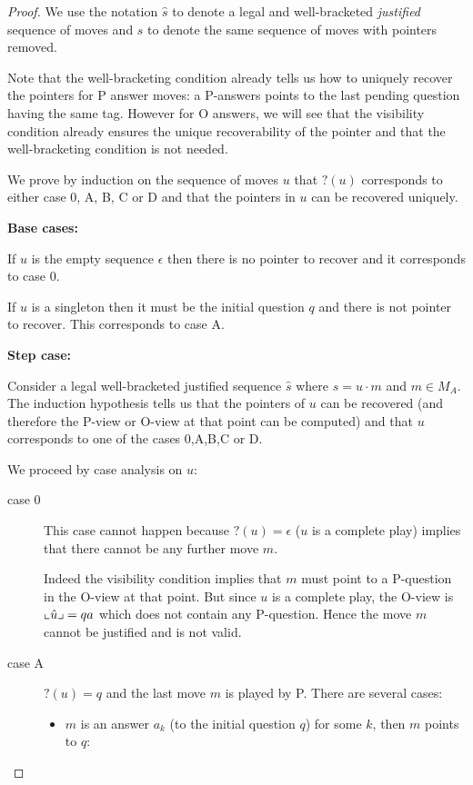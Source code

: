 \begin{proof}
We use the notation $\hat{s}$ to denote a legal and well-bracketed
\emph{justified} sequence of moves and $s$ to denote the same
sequence of moves with pointers removed.

Note that the well-bracketing condition already tells us how to
uniquely recover the pointers for P answer moves: a P-answers points
to the last pending question having the same tag. However for O
answers, we will see that the visibility condition already ensures
the unique recoverability of the pointer and that the
well-bracketing condition is not needed.


We prove by induction on the sequence of moves $u$ that $?(u)$
corresponds to either case 0, A, B, C or D and that the pointers in
$u$ can be recovered uniquely.

\textbf{Base cases:}

If $u$ is the empty sequence $\epsilon$ then there is no pointer to
recover and it corresponds to case 0.

If $u$ is a singleton then it must be the initial question $q$ and
there is not pointer to recover. This corresponds to case A.

\textbf{Step case:}

Consider a legal well-bracketed justified sequence $\hat{s}$ where
$s = u \cdot m$ and $m \in M_A$. The induction hypothesis tells us
that the pointers of $u$ can be recovered (and therefore the P-view
or O-view at that point can be computed) and that $u$ corresponds to
one of the cases 0,A,B,C or D.

We proceed by case analysis on $u$:

\begin{description}

\item[case 0] This case cannot happen because $?(u) = \epsilon$ ($u$ is a complete play) implies that there cannot be any further move $m$.

Indeed the visibility condition implies that $m$ must point to a
P-question in the O-view at that point. But since $u$ is a complete
play, the O-view is $\llcorner \hat{u} \lrcorner = q a$ which does not contain
any P-question. Hence the move $m$ cannot be justified and is not
valid.


\item[case A] $?(u) = q$ and the last move $m$ is played by P.
    There are several cases:
    \begin{itemize}
    \item $m$ is an answer $a_k$ (to the initial question
    $q$) for some $k$, then $m$ points to $q$:


\end{itemize}
\end{description}
\end{proof}
